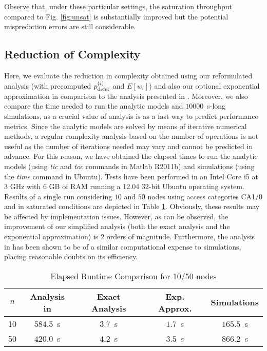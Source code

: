 \documentclass[preprint,12pt]{elsarticle}
\begin{document}
Observe that, under these particular settings, the saturation throughput compared to Fig. \ref{fig:unsat} is substantially improved but the potential misprediction errors are still considerable. 

\subsection{Reduction of Complexity}

Here, we evaluate the reduction in complexity obtained using our reformulated analysis (with precomputed $p_{\rm defer}^{(i)}$ and $E[w_i]$) and also our optional exponential approximation in comparison to the analysis presented in \cite{chung2006performance}. Moreover, we also compare the time needed to run the analytic models and $10000$~s-long simulations, as a crucial value of analysis is as a fast way to predict performance metrics. Since the analytic models are solved by means of iterative numerical methods, a regular complexity analysis based on the number of operations is not useful as the number of iterations needed may vary and cannot be predicted in advance. For this reason, we have obtained the elapsed times to run the analytic models (using \emph{tic} and \emph{toc} commands in Matlab R2011b) and simulations (using the \emph{time} command in Ubuntu). Tests have been performed in an Intel Core i5 at 3 GHz with 6 GB of RAM running a 12.04 32-bit Ubuntu operating system. Results of a single run considering $10$ and $50$ nodes using access categories CA1/0 and in saturated conditions are depicted in Table \ref{tbl:cpu_runtimes}. Obviously, these results may be affected by implementation issues. However, as can be observed, the improvement of our simplified analysis (both the exact analysis and the exponential approximation) is 2 orders of magnitude. Furthermore, the analysis in \cite{chung2006performance} has been shown to be of a similar computational expense to simulations, placing reasonable doubts on its efficiency. 


\begin{table}
\centering
\begin{tabular}{ccccc} 
$n$ & Analysis in \cite{chung2006performance} & Exact Analysis & Exp. Approx. & Simulations\\ \hline
10 & $584.5$~s & $3.7$~s & $1.7$~s & $165.5$~s \\ \hline
50 & $420.0$~s & $4.2$~s & $3.5$~s & $866.2$~s \\ \hline
\end{tabular}
\caption{Elapsed Runtime Comparison for 10/50 nodes}\label{tbl:cpu_runtimes}
\end{table}
\end{document}
